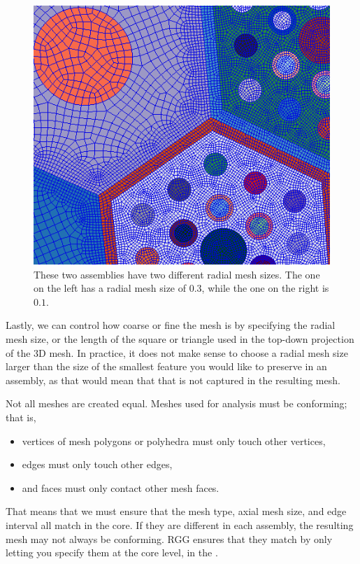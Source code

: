 \begin{figure}
	\begin{center}
		\includegraphics[width=0.8\linewidth]{Images/radial-mesh-size.png}
		\caption{These two assemblies have two different radial mesh sizes.  The one on the left has a radial mesh size of $0.3$, while the one on the right is $0.1$.}
		\label{fig:RadialMesh}
	\end{center}
\end{figure}

Lastly, we can control how coarse or fine the mesh is by specifying the radial mesh size, or the length of the square or triangle used in the top-down projection of the 3D mesh.  In practice, it does not make sense to choose a radial mesh size larger than the size of the smallest feature you would like to preserve in an assembly, as that would mean that that is not captured in the resulting mesh.

Not all meshes are created equal.  Meshes used for analysis must be conforming; that is,

\begin{itemize}
	\item{vertices of mesh polygons or polyhedra must only touch other vertices,}
	\item{edges must only touch other edges,}
	\item{and faces must only contact other mesh faces.}
\end{itemize}

That means that we must ensure that the mesh type, axial mesh size, and edge interval all match in the core.  If they are different in each assembly, the resulting mesh may not always be conforming.  RGG ensures that they match by only letting you specify them at the core level, in the .

